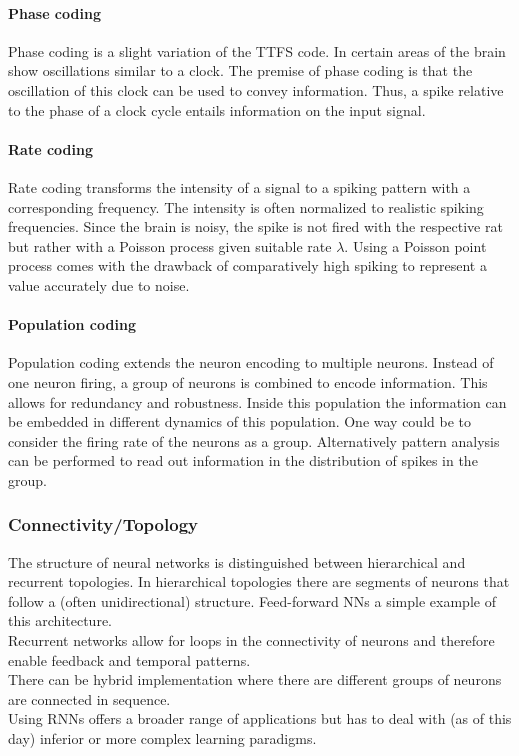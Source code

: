 	\paragraph{Phase coding}
	Phase coding is a slight variation of the \ac{TTFS} code. In certain areas of the brain show oscillations similar to a clock\cite{jacobs_critical_2013}. The premise of phase coding is that the oscillation of this clock can be used to convey information. Thus, a spike relative to the phase of a clock cycle entails information on the input signal.\\
	\paragraph{Rate coding}
	Rate coding transforms the intensity of a signal to a spiking pattern with a corresponding frequency. The intensity is often normalized to realistic spiking frequencies. Since the brain is noisy, the spike is not fired with the respective rat but rather with a Poisson process given suitable rate $\lambda$.
	Using a Poisson point process comes with the drawback of comparatively high spiking to represent a value accurately due to noise.
	\paragraph{Population coding}
	Population coding extends the neuron encoding to multiple neurons. Instead of one neuron firing, a group of neurons is combined to encode information. This allows for redundancy and robustness. Inside this population the information can be embedded in different dynamics of this population. One way could be to consider the firing rate of the neurons as a group. Alternatively pattern analysis can be performed to read out information in the distribution of spikes in the group.\\

\subsubsection{Connectivity/Topology}
	The structure of neural networks is distinguished between hierarchical and recurrent topologies. In hierarchical topologies there are segments of neurons that follow a (often unidirectional) structure. Feed-forward \acp{NN} a simple example of this architecture.\\
	Recurrent networks allow for loops in the connectivity of neurons and therefore enable feedback and temporal patterns.\\
	There can be hybrid implementation where there are different groups of neurons are connected in sequence.\\
	Using \acp{RNN} offers a broader range of applications but has to deal with (as of this day) inferior or more complex learning paradigms.\\


